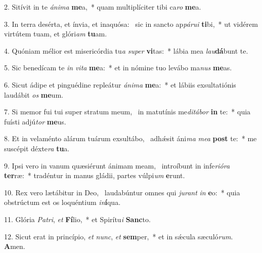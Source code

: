 2. Sitívit in te \textit{á}\textit{ni}\textit{ma} \textbf{me}a,~*  quam multiplíciter tibi ca\textit{ro} \textbf{me}a.\

3. In terra desérta, et ínvia, et inaquósa: \dag\  sic in sancto ap\textit{pá}\textit{ru}\textit{i} \textbf{ti}bi,~*  ut vidérem virtútem tuam, et glóri\textit{am} \textbf{tu}am.\

4. Quóniam mélior est misericórdia tu\textit{a} \textit{su}\textit{per} \textbf{vi}tas:~*  lábia mea \textit{lau}\textbf{dá}bunt te.\

5. Sic benedícam te \textit{in} \textit{vi}\textit{ta} \textbf{me}a:~*  et in nómine tuo levábo ma\textit{nus} \textbf{me}as.\

6. Sicut ádipe et pinguédine repleátur \textit{á}\textit{ni}\textit{ma} \textbf{me}a:~*  et lábiis exsultatiónis laudábit \textit{os} \textbf{me}um.\

7. Si memor fui tui super stratum meum, \dag\  in matutínis me\textit{di}\textit{tá}\textit{bor} \textbf{in} te:~*  quia fuísti adjú\textit{tor} \textbf{me}us.\

8. Et in velaménto alárum tuárum exsultábo, \dag\  adhǽsit áni\textit{ma} \textit{me}\textit{a} \textbf{post} te:~*  me suscépit déxte\textit{ra} \textbf{tu}a.\

9. Ipsi vero in vanum quæsiérunt ánimam meam, \dag\  introíbunt in infe\textit{ri}\textit{ó}\textit{ra} \textbf{ter}ræ:~*  tradéntur in manus gládii, partes vúlpi\textit{um} \textbf{e}runt.\

10. Rex vero lætábitur in Deo, \dag\  laudabúntur omnes qui \textit{ju}\textit{rant} \textit{in} \textbf{e}o:~*  quia obstrúctum est os loquéntium \textit{in}\textbf{í}qua.\

11. Glória \textit{Pa}\textit{tri}, \textit{et} \textbf{Fí}lio,~*  et Spirítu\textit{i} \textbf{Sanc}to.\

12. Sicut erat in princípio, \textit{et} \textit{nunc}, \textit{et} \textbf{sem}per,~*  et in sǽcula sæculó\textit{rum}. \textbf{A}men.\

